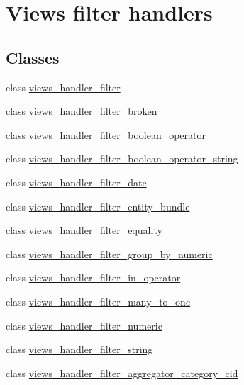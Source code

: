 \hypertarget{group__views__filter__handlers}{
\section{Views filter handlers}
\label{group__views__filter__handlers}
}
\subsection*{Classes}
\begin{DoxyCompactItemize}
\item 
class \hyperlink{classviews__handler__filter}{views\_\-handler\_\-filter}
\item 
class \hyperlink{classviews__handler__filter__broken}{views\_\-handler\_\-filter\_\-broken}
\item 
class \hyperlink{classviews__handler__filter__boolean__operator}{views\_\-handler\_\-filter\_\-boolean\_\-operator}
\item 
class \hyperlink{classviews__handler__filter__boolean__operator__string}{views\_\-handler\_\-filter\_\-boolean\_\-operator\_\-string}
\item 
class \hyperlink{classviews__handler__filter__date}{views\_\-handler\_\-filter\_\-date}
\item 
class \hyperlink{classviews__handler__filter__entity__bundle}{views\_\-handler\_\-filter\_\-entity\_\-bundle}
\item 
class \hyperlink{classviews__handler__filter__equality}{views\_\-handler\_\-filter\_\-equality}
\item 
class \hyperlink{classviews__handler__filter__group__by__numeric}{views\_\-handler\_\-filter\_\-group\_\-by\_\-numeric}
\item 
class \hyperlink{classviews__handler__filter__in__operator}{views\_\-handler\_\-filter\_\-in\_\-operator}
\item 
class \hyperlink{classviews__handler__filter__many__to__one}{views\_\-handler\_\-filter\_\-many\_\-to\_\-one}
\item 
class \hyperlink{classviews__handler__filter__numeric}{views\_\-handler\_\-filter\_\-numeric}
\item 
class \hyperlink{classviews__handler__filter__string}{views\_\-handler\_\-filter\_\-string}
\item 
class \hyperlink{classviews__handler__filter__aggregator__category__cid}{views\_\-handler\_\-filter\_\-aggregator\_\-category\_\-cid}
\item 

\end{DoxyCompactItemize}
